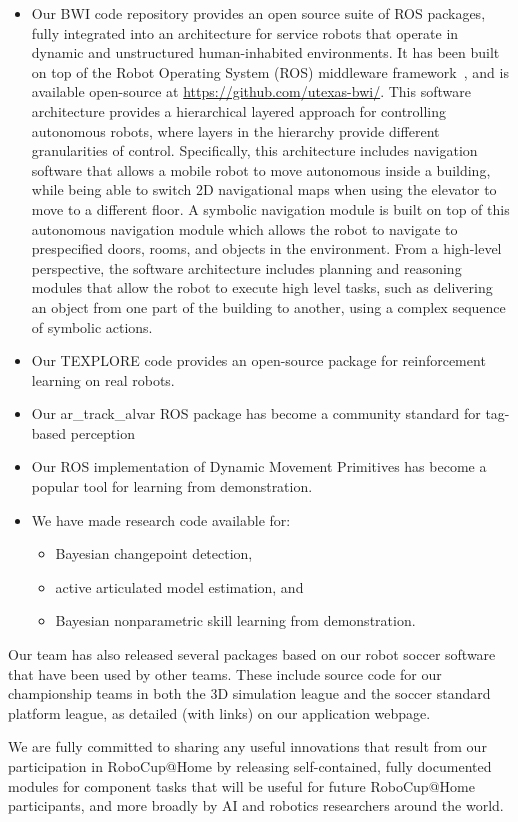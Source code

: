 \begin{itemize}

\item Our BWI code repository provides an open source suite of ROS
packages, fully integrated into an architecture for service robots
that operate in dynamic and unstructured human-inhabited environments.
It has been built on top of the Robot Operating System (ROS)
middleware framework~\cite{quigley2009ros}, and is available
open-source at \url{https://github.com/utexas-bwi/}. This software
architecture provides a hierarchical layered approach for controlling
autonomous robots, where layers in the hierarchy provide different
granularities of control.  Specifically, this architecture includes
navigation software that allows a mobile robot to move autonomous
inside a building, while being able to switch 2D navigational maps
when using the elevator to move to a different floor. A symbolic
navigation module is built on top of this autonomous navigation module
which allows the robot to navigate to prespecified doors, rooms, and
objects in the environment.  From a high-level perspective, the software
architecture includes planning and reasoning modules that allow the
robot to execute high level tasks, such as delivering an object from
one part of the building to another, using a complex sequence of
symbolic actions.

\item Our TEXPLORE code provides an open-source package for
reinforcement learning on real robots.

\item Our ar\_track\_alvar ROS package has become a community standard
for tag-based perception

\item Our ROS implementation of Dynamic Movement Primitives has become
a popular tool for learning from demonstration.

\item We have made research code available for:

  \begin{itemize}
  \item Bayesian changepoint detection,
  \item active articulated model estimation, and
  \item Bayesian nonparametric skill learning from demonstration.
  \end{itemize}

\end{itemize}

Our team has also released several packages based on our robot soccer
software that have been used by other teams.  These include source code
for our championship teams in both the 3D simulation league and the
soccer standard platform league, as detailed (with links) on our
application webpage.

We are fully committed to sharing any useful innovations that result
from our participation in RoboCup@Home by releasing self-contained,
fully documented modules for component tasks that will be useful for
future RoboCup@Home participants, and more broadly by AI and robotics
researchers around the world.
